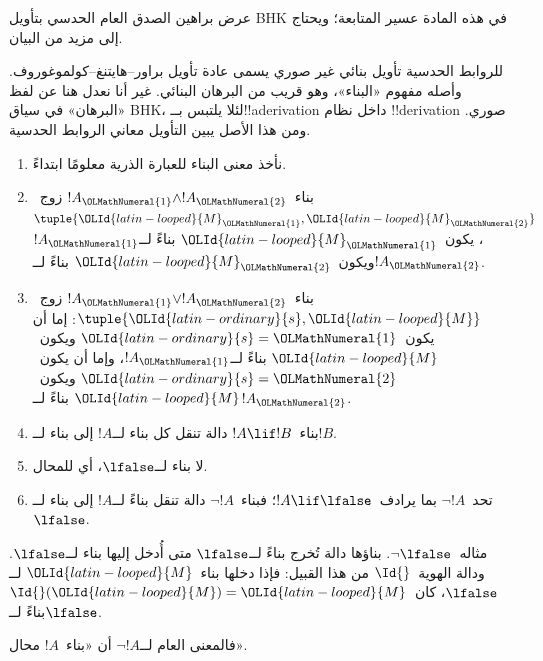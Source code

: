 \documentclass[../../../include/open-logic-section]{subfiles}
\begin{document}


\begin{editorial}
  عرض براهين الصدق العام الحدسي بتأويل BHK في هذه المادة عسير المتابعة؛
  ويحتاج إلى مزيد من البيان.
\end{editorial}

للروابط الحدسية تأويل بنائي غير صوري يسمى عادة تأويل
براور--هايتنغ--كولموغوروف. وأصله مفهوم «البناء»، وهو قريب من البرهان
البنائي. غير أنا نعدل هنا عن لفظ «البرهان» في سياق BHK، لئلا يلتبس
بــ!!a{derivation} داخل نظام !!{derivation} صوري. ومن هذا الأصل يبين
التأويل معاني الروابط الحدسية.

\begin{enumerate}
\item نأخذ معنى البناء للعبارة الذرية معلومًا ابتداءً.
\item بناء~$!A_\OLMathNumeral{1} \land !A_\OLMathNumeral{2}$ زوج~$\tuple{\OLId{latin-looped}{M}_\OLMathNumeral{1}, \OLId{latin-looped}{M}_\OLMathNumeral{2}}$، يكون~$\OLId{latin-looped}{M}_\OLMathNumeral{1}$
  بناءً لــ$!A_\OLMathNumeral{1}$ ويكون~$\OLId{latin-looped}{M}_\OLMathNumeral{2}$ بناءً لــ$!A_\OLMathNumeral{2}$.
\item بناء~$!A_\OLMathNumeral{1} \lor !A_\OLMathNumeral{2}$ زوج~$\tuple{\OLId{latin-ordinary}{s}, \OLId{latin-looped}{M}}$: إما أن يكون~$\OLId{latin-ordinary}{s}=\OLMathNumeral{1}$
  ويكون~$\OLId{latin-looped}{M}$ بناءً لــ$!A_\OLMathNumeral{1}$، وإما أن يكون~$\OLId{latin-ordinary}{s}=\OLMathNumeral{2}$ ويكون~$\OLId{latin-looped}{M}$ بناءً لــ$!A_\OLMathNumeral{2}$.
\item بناء~$!A \lif !B$ دالة تنقل كل بناء لــ$!A$ إلى بناء لــ$!B$.
\item لا بناء لــ$\lfalse$، أي للمحال.
\item تحد~$\lnot !A$ بما يرادف~$!A \lif \lfalse$؛ فبناء~$\lnot !A$
  دالة تنقل بناءً لــ$!A$ إلى بناء لــ$\lfalse$.
\end{enumerate}

\begin{ex}
مثاله~$\lnot \lfalse$. بناؤها دالة تُخرج بناءً لــ$\lfalse$ متى أُدخل
إليها بناء لــ$\lfalse$. ودالة الهوية~$\Id{}$ من هذا القبيل: فإذا دخلها
بناء~$\OLId{latin-looped}{M}$ لــ$\lfalse$، كان~$\Id{}(\OLId{latin-looped}{M}) = \OLId{latin-looped}{M}$ بناءً لــ$\lfalse$.
\end{ex}

فالمعنى العام لــ$\lnot !A$ أن «بناء~$!A$ محال».
\end{document}
